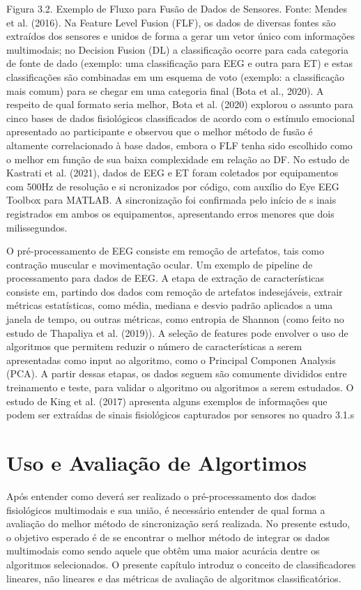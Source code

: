 Figura 3.2. Exemplo de Fluxo para Fusão de Dados de Sensores. Fonte:  Mendes et al. (2016).
Na Feature Level Fusion (FLF), os dados de diversas fontes são extraídos dos sensores e unidos de forma a 
gerar um vetor único com informações multimodais; no Decision Fusion (DL) a classificação ocorre para cada categoria 
de fonte de dado (exemplo: uma classificação para EEG e outra para ET) e estas classificações são combinadas em um esquema de voto (exemplo: a classificação mais comum) para se chegar em uma categoria final (Bota et al., 2020). A respeito de qual formato seria melhor, Bota et al. (2020) explorou o assunto para cinco bases de dados fisiológicos classificados de acordo com o estímulo emocional apresentado ao participante e observou que o melhor método de fusão é altamente correlacionado à base dados, embora o FLF tenha sido escolhido como o melhor em função de sua baixa complexidade em relação ao DF. 
No estudo de Kastrati et al. (2021), dados de EEG e ET foram coletados por equipamentos com 500Hz de resolução e si
ncronizados por código, com auxílio do Eye EEG Toolbox para MATLAB. A sincronização foi confirmada pelo início de s
inais registrados em ambos os equipamentos, apresentando erros menores que dois milissegundos. 


O pré-processamento de EEG consiste em remoção de artefatos, 
tais como contração muscular e movimentação ocular.
Um exemplo de pipeline de processamento para dados de EEG.
A etapa de extração de características consiste em, partindo dos dados com 
remoção de artefatos indesejáveis, extrair métricas estatísticas, como média, 
mediana e desvio padrão aplicados a uma janela de tempo, ou outras métricas, como entropia de Shannon 
(como feito no estudo de Thapaliya et al. (2019)). A seleção de features pode 
envolver o uso de algoritmos que permitem reduzir o número de características a 
serem apresentadas como input ao algoritmo, como o Principal Componen Analysis (PCA).
 A partir dessas etapas, os dados seguem são comumente divididos entre treinamento e 
 teste, para validar o algoritmo ou algoritmos a serem estudados. 
 O estudo de King et al. (2017) apresenta alguns exemplos de informações que podem ser extraídas de sinais fisiológicos capturados por sensores no quadro 3.1.s

\section{Uso e Avaliação de Algortimos}

Após entender como deverá ser realizado o pré-processamento dos dados fisiológicos multimodais e sua união, 
é necessário entender de qual forma a avaliação do melhor método de sincronização será realizada. 
No presente estudo, o objetivo esperado é de se encontrar o melhor
método de integrar os dados multimodais como sendo aquele que obtêm uma maior acurácia dentre os 
algoritmos selecionados. O presente capítulo introduz o conceito de classificadores lineares,
não lineares e das métricas de avaliação de algoritmos classificatórios.



